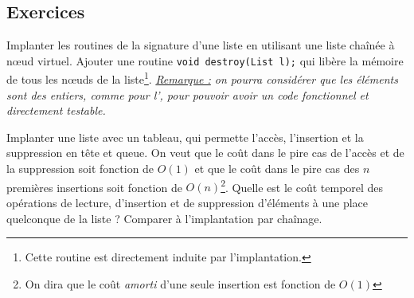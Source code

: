 \documentclass[../../../main.tex]{subfiles}
\begin{document}

\subsection{Exercices}
 Implanter les routines de la signature d'une liste en utilisant une liste chaînée à n\oe{}ud virtuel. Ajouter une routine \texttt{void destroy(List l);} qui libère la mémoire de tous les n\oe{}uds de la liste\footnote{Cette routine est directement induite par l'implantation.}. \newline
\textit{\underline{Remarque :} on pourra considérer que les éléments sont des entiers, comme pour l', pour pouvoir avoir un code fonctionnel et directement testable.}

 Implanter une liste avec un tableau, qui permette l'accès, l'insertion et la suppression en tête et queue. On veut que le coût dans le pire cas de l'accès et de la suppression soit fonction de $O(1)$ et que le coût dans le pire cas des $n$ premières insertions soit fonction de $O(n)$\footnote{On dira que le coût \textit{amorti} d'une seule insertion est fonction de $O(1)$}. Quelle est le coût temporel des opérations de lecture, d'insertion et de suppression d'éléments à une place quelconque de la liste ? Comparer à l'implantation par chaînage.
\end{document}
